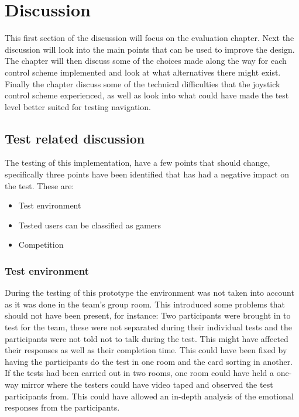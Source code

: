 \chapter{Discussion}
This first section of the discussion will focus on the evaluation chapter. Next the discussion will look into the main points that can be used to improve the design. The chapter will then discuss some of the choices made along the way for each control scheme implemented and look at what alternatives there might exist. Finally the chapter discuss some of the technical difficulties that the joystick control scheme experienced, as well as look into what could have made the test level better suited for testing navigation.

\section*{Test related discussion}
The testing of this implementation, have a few points that should change, specifically three points have been identified that has had a negative impact on the test. These are:

\begin{itemize}
\item Test environment
\item Tested users can be classified as gamers
\item Competition
\end{itemize}

\subsection*{Test environment}
During the testing of this prototype the environment was not taken into account as it was done in the team's group room. This introduced some problems that should not have been present, for instance: Two participants were brought in to test for the team, these were not separated during their individual tests and the participants were not told not to talk during the test. This might have affected their responses as well as their completion time. This could have been fixed by having the participants do the test in one room and the card sorting in another. If the tests had been carried out in two rooms, one room could have held a one-way mirror where the testers could have video taped and observed the test participants from. This could have allowed an in-depth analysis of the emotional responses from the participants. 

